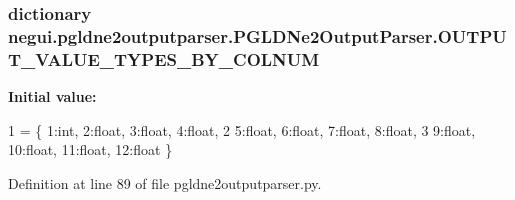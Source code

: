 \subsubsection[{\texorpdfstring{O\+U\+T\+P\+U\+T\+\_\+\+V\+A\+L\+U\+E\+\_\+\+T\+Y\+P\+E\+S\+\_\+\+B\+Y\+\_\+\+C\+O\+L\+N\+UM}{OUTPUT_VALUE_TYPES_BY_COLNUM}}]{\setlength{\rightskip}{0pt plus 5cm}dictionary negui.\+pgldne2outputparser.\+P\+G\+L\+D\+Ne2\+Output\+Parser.\+O\+U\+T\+P\+U\+T\+\_\+\+V\+A\+L\+U\+E\+\_\+\+T\+Y\+P\+E\+S\+\_\+\+B\+Y\+\_\+\+C\+O\+L\+N\+UM\hspace{0.3cm}{\ttfamily [static]}}\hypertarget{classnegui_1_1pgldne2outputparser_1_1PGLDNe2OutputParser_ae6f1338da4df39f8473fc6cf44dd8c95}{}\label{classnegui_1_1pgldne2outputparser_1_1PGLDNe2OutputParser_ae6f1338da4df39f8473fc6cf44dd8c95}
{\bfseries Initial value\+:}
\begin{DoxyCode}
1 = \{ 1:int, 2:float, 3:float, 4:float, 
2                                     5:float, 6:float, 7:float, 8:float, 
3                                     9:float, 10:float, 11:float, 12:float \}
\end{DoxyCode}


Definition at line 89 of file pgldne2outputparser.\+py.

